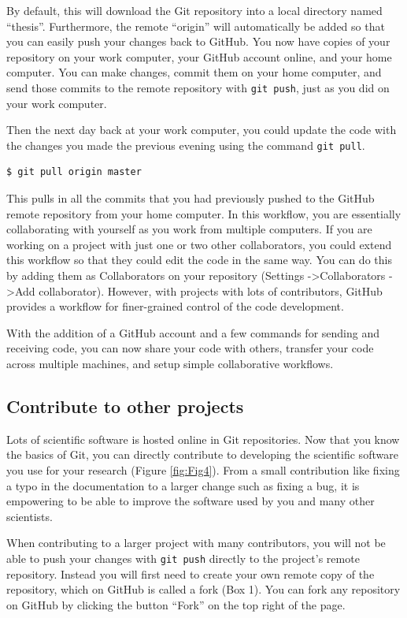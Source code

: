 \documentclass[10pt]{article}
\begin{document}
By default, this will download the Git repository into a local directory named ``thesis''.
Furthermore, the remote ``origin'' will automatically be added so that you can easily push your changes back to GitHub.
You now have copies of your repository on your work computer, your GitHub account online, and your home computer.
You can make changes, commit them on your home computer, and send those commits to the remote repository with \verb|git push|, just as you did on your work computer.

Then the next day back at your work computer, you could update the code with the changes you made the previous evening using the command \verb|git pull|.

\begin{verbatim}
$ git pull origin master
\end{verbatim}

This pulls in all the commits that you had previously pushed to the GitHub remote repository from your home computer.
In this workflow, you are essentially collaborating with yourself as you work from multiple computers.
If you are working on a project with just one or two other collaborators, you could extend this workflow so that they could edit the code in the same way.
You can do this by adding them as Collaborators on your repository (Settings -\textgreater Collaborators -\textgreater Add collaborator).
However, with projects with lots of contributors, GitHub provides a workflow for finer-grained control of the code development.

With the addition of a GitHub account and a few commands for sending and receiving code, you can now share your code with others, transfer your code across multiple machines, and setup simple collaborative workflows.


\subsection{Contribute to other projects}

Lots of scientific software is hosted online in Git repositories.
Now that you know the basics of Git, you can directly contribute to developing the scientific software you use for your research (Figure \ref{fig:Fig4}).
From a small contribution like fixing a typo in the documentation to a larger change such as fixing a bug, it is empowering to be able to improve the software used by you and many other scientists.

When contributing to a larger project with many contributors, you will not be able to push your changes with \verb|git push| directly to the project's remote repository.
Instead you will first need to create your own remote copy of the repository, which on GitHub is called a fork (Box 1).
You can fork any repository on GitHub by clicking the button ``Fork'' on the top right of the page.
\end{document}
